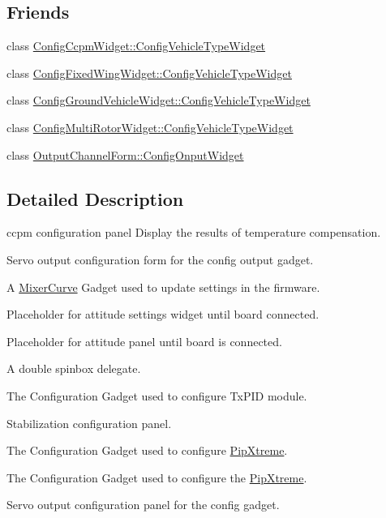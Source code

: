 \subsection*{Friends}
\begin{DoxyCompactItemize}
\item 
class \hyperlink{group___config_plugin_gaf1f904d5df6619518f3228b2d5d238d0}{Config\-Ccpm\-Widget\-::\-Config\-Vehicle\-Type\-Widget}
\item 
class \hyperlink{group___config_plugin_gaf1f904d5df6619518f3228b2d5d238d0}{Config\-Fixed\-Wing\-Widget\-::\-Config\-Vehicle\-Type\-Widget}
\item 
class \hyperlink{group___config_plugin_gaf1f904d5df6619518f3228b2d5d238d0}{Config\-Ground\-Vehicle\-Widget\-::\-Config\-Vehicle\-Type\-Widget}
\item 
class \hyperlink{group___config_plugin_gaf1f904d5df6619518f3228b2d5d238d0}{Config\-Multi\-Rotor\-Widget\-::\-Config\-Vehicle\-Type\-Widget}
\item 
class \hyperlink{group___config_plugin_ga92a68401074780ed6cadf27f127892e3}{Output\-Channel\-Form\-::\-Config\-Onput\-Widget}
\end{DoxyCompactItemize}


\subsection{Detailed Description}
ccpm configuration panel Display the results of temperature compensation.

Servo output configuration form for the config output gadget.

A \hyperlink{class_mixer_curve}{Mixer\-Curve} Gadget used to update settings in the firmware.

Placeholder for attitude settings widget until board connected.

Placeholder for attitude panel until board is connected.

A double spinbox delegate.

The Configuration Gadget used to configure Tx\-P\-I\-D module.

Stabilization configuration panel.

The Configuration Gadget used to configure \hyperlink{class_pip_xtreme}{Pip\-Xtreme}.

The Configuration Gadget used to configure the \hyperlink{class_pip_xtreme}{Pip\-Xtreme}.

Servo output configuration panel for the config gadget.

